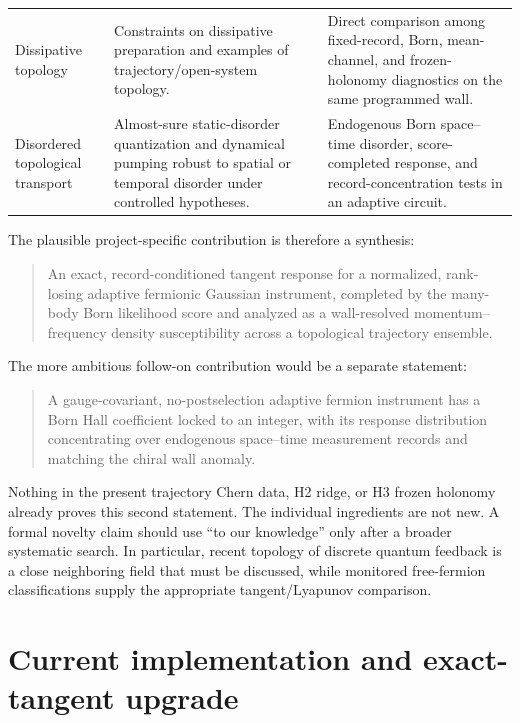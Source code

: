\documentclass[aps,prb,onecolumn,nofootinbib,superscriptaddress]{revtex4-2}
\begin{document}
\begin{table}[t]
\begin{tabularx}{\textwidth}{@{}L{0.21\textwidth}L{0.32\textwidth}Y@{}}
Dissipative topology
\cite{Goldstein2019,ShavitGoldstein2020,GneitingKoottandavidaRozhkovNori2022}
& Constraints on dissipative preparation and examples of trajectory/open-system
topology. & Direct comparison among fixed-record, Born, mean-channel, and
frozen-holonomy diagnostics on the same programmed wall. \\
Disordered topological transport
\cite{NiuThoulessWu1985,BellissardVanElstSchulzBaldes1994,TitumBergRudnerRefaelLindner2016,TimmsSiebererKolodrubetz2021}
& Almost-sure static-disorder quantization and dynamical pumping robust to
spatial or temporal disorder under controlled hypotheses. & Endogenous Born
space--time disorder, score-completed response, and record-concentration tests
in an adaptive circuit. \\
\bottomrule
\end{tabularx}
\end{table}

The plausible project-specific contribution is therefore a synthesis:
\begin{quote}
An exact, record-conditioned tangent response for a normalized, rank-losing
adaptive fermionic Gaussian instrument, completed by the many-body Born
likelihood score and analyzed as a wall-resolved momentum--frequency density
susceptibility across a topological trajectory ensemble.
\end{quote}
The more ambitious follow-on contribution would be a separate statement:
\begin{quote}
A gauge-covariant, no-postselection adaptive fermion instrument has a Born Hall
coefficient locked to an integer, with its response distribution concentrating
over endogenous space--time measurement records and matching the chiral wall
anomaly.
\end{quote}
Nothing in the present trajectory Chern data, H2 ridge, or H3 frozen holonomy
already proves this second statement.
The individual ingredients are not new.  A formal novelty claim should use
``to our knowledge'' only after a broader systematic search.  In particular,
recent topology of discrete quantum feedback
\cite{NakagawaUeda2025} is a close neighboring field that must be discussed,
while monitored free-fermion classifications
\cite{XiaoKawabata2026} supply the appropriate tangent/Lyapunov comparison.

\section{Current implementation and exact-tangent upgrade}
\label{sec:implementation}
\end{document}
